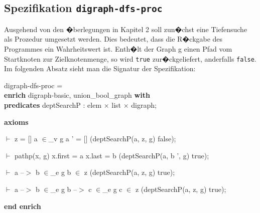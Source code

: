 ﻿\subsection{Spezifikation \texttt{digraph-dfs-proc}}
\label{sec:digraph-dfs-proc}

Ausgehend von den �berlegungen in Kapitel 2 soll zun�chst eine Tiefensuche als Prozedur umgesetzt werden.
Dies bedeutet, dass die R�ckgabe des Programmes ein Wahrheitswert ist. Enth�lt der Graph g einen Pfad vom Startknoten zur Zielknotenmenge, so
wird \texttt{true} zur�ckgeliefert, anderfalls \texttt{false}. Im folgenden Absatz sieht man die Signatur der Spezifikation:

digraph-dfs-proc = \\
{\bf enrich} digraph-basic, union\_bool\_graph {\bf with}\+\\
{\bf predicates} deptSearchP  : elem $\times$ list $\times$ digraph;

{\bf axioms}

$\vdash$ z = [] \And a $\in$\_v g \Or a ' = [] \Imp (deptSearchP(a, z, g) \Equiv false);

$\vdash$ pathp(x, g) \And x.first = a \And x.last = b \Imp (deptSearchP(a, b ', g) \Equiv true);

$\vdash$ a --$>$ b $\in$\_e g \And b $\in$ z \Imp (deptSearchP(a, z, g) \Equiv true);

$\vdash$ a --$>$ b $\in$\_e g \And b --$>$ c $\in$\_e g \And c $\in$ z \Imp (deptSearchP(a, z, g) \Equiv true);

{\bf end enrich}

